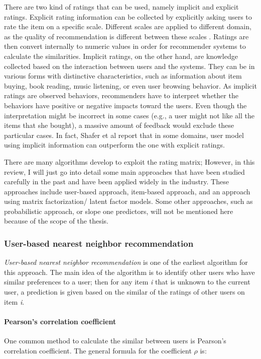 There are two kind of ratings that can be used, namely implicit and explicit ratings. Explicit rating information can be collected by explicitly asking users to rate the item on a specific scale. Different scales are applied to different domain, as the quality of recommendation is different between these scales \cite{cosley2003seeing}. Ratings are then convert internally to numeric values in order for recommender systems to calculate the similarities. Implicit ratings, on the other hand, are knowledge collected based on the interaction between users and the systems. They can be in various forms with distinctive characteristics, such as information about item buying, book reading, music listening, or even user browsing behavior. As implicit ratings are observed behaviors, recommenders have to interpret whether the behaviors have positive or negative impacts toward the users. Even though the interpretation might be incorrect in some cases (e.g., a user might not like all the items that she bought), a massive amount of feedback would exclude these particular cases. In fact, Shafer et al \cite{schafer2006recommender} report that in some domains, user model using implicit information can outperform the one with explicit ratings.

There are many algorithms develop to exploit the rating matrix; However, in this review, I will just go into detail some main approaches that have been studied carefully in the past and have been applied widely in the industry. These approaches include user-based approach, item-based approach, and an approach using matrix factorization/ latent factor models. Some other approaches, such as probabilistic approach, or slope one predictors, will not be mentioned here because of the scope of the thesis.

\subsubsection{User-based nearest neighbor recommendation}
\textit{User-based nearest neighbor recommendation} is one of the earliest algorithm for this approach. The main idea of the algorithm is to identify other users who have similar preferences to a user; then for any item \textit{i} that is unknown to the current user, a prediction is given based on the similar of the ratings of other users on item \textit{i}.

\paragraph{Pearson's correlation coefficient}
One common method to calculate the similar between users is Pearson's correlation coefficient. The general formula for the coefficient \(\rho\) \cite{benesty2009pearson} is:


